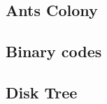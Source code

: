         \subsection{Ants Colony}
                
        \subsection{Binary codes}        
                
        \subsection{Disk Tree}        
                
%                 
%                 

%                 

